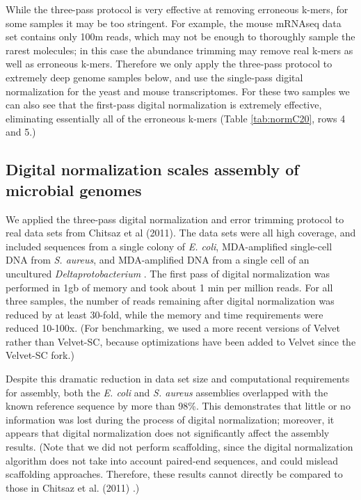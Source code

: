 \documentclass{pnastwo}
\begin{document}
\begin{article}
While the three-pass protocol is very effective at removing erroneous
k-mers, for some samples it may be too stringent.  For example, the
mouse mRNAseq data set contains only 100m reads, which may not be
enough to thoroughly sample the rarest molecules; in this case the
abundance trimming may remove real k-mers as well as erroneous k-mers.
Therefore we only apply the three-pass protocol to extremely deep
genome samples below, and use the single-pass digital normalization
for the yeast and mouse transcriptomes.  For these two samples we can
also see that the first-pass digital normalization is extremely effective,
eliminating essentially all of the erroneous k-mers (Table \ref{tab:normC20},
rows 4 and 5.)

\subsection{Digital normalization scales assembly of microbial genomes}

We applied the three-pass digital normalization and error trimming
protocol to real data sets from Chitsaz et al (2011).  The data sets
were all high coverage, and included sequences from a single colony of
{\em E. coli}, MDA-amplified single-cell DNA from {\em S. aureus}, and
MDA-amplified DNA from a single cell of an uncultured {\em
  Deltaprotobacterium} \cite{pubmed21926975}.  The first pass of
digital normalization was performed in 1gb of memory and took about 1
min per million reads.  For all three samples, the number of reads
remaining after digital normalization was reduced by at least 30-fold,
while the memory and time requirements were reduced 10-100x.  (For
benchmarking, we used a more recent versions of Velvet rather than
Velvet-SC, because optimizations have been added to Velvet since the
Velvet-SC fork.)

Despite this dramatic reduction in data set size and computational
requirements for assembly, both the {\em E. coli} and {\em S. aureus}
assemblies overlapped with the known reference sequence by more than
98\%.  This demonstrates that little or no information was lost during
the process of digital normalization; moreover, it appears that
digital normalization does not significantly affect the assembly results.
(Note that we did not perform scaffolding, since the digital
normalization algorithm does not take into account paired-end
sequences, and could mislead scaffolding approaches.  Therefore, these
results cannot directly be compared to those in Chitsaz et al. (2011)
\cite{pubmed21926975}.)


\end{article}
\end{document}
